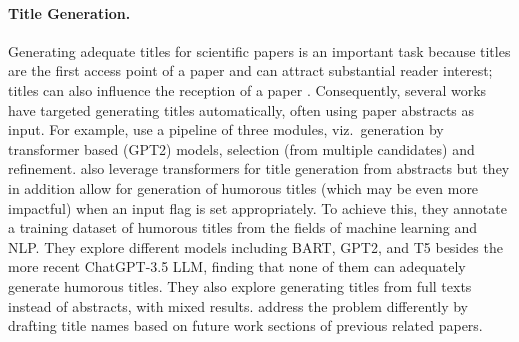 \paragraph{Title Generation.} %
Generating adequate titles for scientific papers is an important task because titles are the first access point of a paper and can attract substantial reader interest; titles can also influence the reception of a paper \citep{letchford2015advantage}.  Consequently, several works have targeted generating titles automatically, often using paper abstracts as input. For example, \citet{mishra2021automatic} use a pipeline of three modules, viz.\ generation by transformer based (GPT2) models, selection (from multiple candidates) and refinement.  \citet{chen-eger-2023-transformers} also leverage transformers for title generation from abstracts but they in addition allow for generation of  humorous titles (which may be even more impactful) when an input flag is set appropriately. To achieve this, they annotate a training dataset of humorous titles from the fields of machine learning and NLP. %
They explore different models including BART, GPT2, and T5 besides the more recent ChatGPT-3.5 LLM, finding that none of them can adequately generate humorous titles. They also explore generating titles from full texts instead of abstracts, with mixed results. \citet{wang-etal-2019-paperrobot} address the problem differently by drafting title names based on future work sections of previous related papers.

